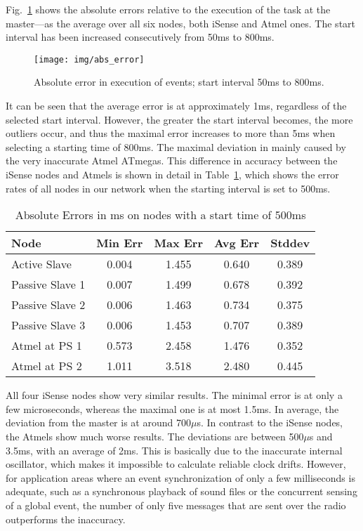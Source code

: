 Fig.~\ref{sec:exp:sync_variation} shows the absolute errors
relative to the execution of the task at the master---as the average
over all six nodes, both iSense and Atmel ones. The start interval has
been increased consecutively from 50ms to 800ms.

\begin{figure}
  \center
  \texttt{[image: img/abs\_error]}
  \caption{Absolute error in execution of events; start interval 50ms
    to 800ms.}
  \label{sec:exp:sync_variation}
\end{figure}

It can be seen that the average error is at approximately 1ms,
regardless of the selected start interval. However, the greater the
start interval becomes, the more outliers occur, and thus the maximal
error increases to more than 5ms when selecting a starting time of
800ms. The maximal deviation in mainly caused by the very
inaccurate Atmel ATmegas. This difference in accuracy between the
iSense nodes and Atmels is shown in detail in
Table~\ref{sec:exp:errors}, which shows the error rates of all
nodes in our network when the starting interval is set to 500ms.

\begin{table}
  \caption{Absolute Errors in ms on nodes with a start time of 500ms}
  \center
  \begin{tabular}{ |l|c c c c| }
    \hline
    Node            & Min Err & Max Err & Avg Err & Stddev \\
    \hline
    Active Slave    & 0.004   & 1.455   & 0.640   & 0.389 \\
    Passive Slave 1 & 0.007   & 1.499   & 0.678   & 0.392 \\
    Passive Slave 2 & 0.006   & 1.463   & 0.734   & 0.375 \\
    Passive Slave 3 & 0.006   & 1.453   & 0.707   & 0.389 \\
    Atmel at PS 1   & 0.573   & 2.458   & 1.476   & 0.352 \\
    Atmel at PS 2   & 1.011   & 3.518   & 2.480   & 0.445 \\
    \hline
  \end{tabular}
  \label{sec:exp:errors}
\end{table}

All four iSense nodes show very similar results. The minimal error is
at only a few microseconds, whereas the maximal one is at most
1.5ms. In average, the deviation from the master is at around
700$\mu$s. In contrast to the iSense nodes, the Atmels show much worse
results. The deviations are between 500$\mu$s and 3.5ms, with an
average of 2ms. This is basically due to the inaccurate internal
oscillator, which makes it impossible to calculate reliable clock
drifts. However, for application areas where an event synchronization
of only a few milliseconds is adequate, such as a synchronous
playback of sound files or the concurrent sensing of a global event,
the number of only five messages that are sent over the radio
outperforms the inaccuracy.

